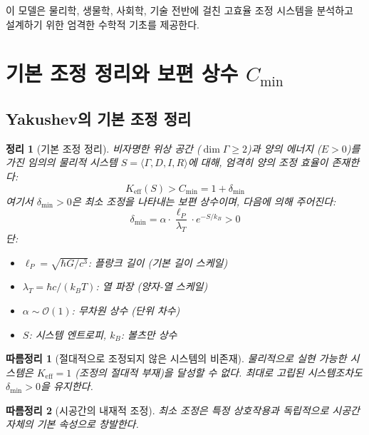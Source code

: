 \documentclass[11pt,a4paper]{article}
\newtheorem{theorem}{정리}
\newtheorem{corollary}{따름정리}
\begin{document}
이 모델은 물리학, 생물학, 사회학, 기술 전반에 걸친 고효율 조정 시스템을 분석하고 설계하기 위한 엄격한 수학적 기초를 제공한다.

\section{기본 조정 정리와 보편 상수 \texorpdfstring{$C_{\min}$}{C\_min}}
\label{sec:fundamental-theorem}

\subsection{Yakushev의 기본 조정 정리}

\begin{theorem}[기본 조정 정리]
	비자명한 위상 공간 ($\dim\Gamma \geq 2$)과 양의 에너지 ($E > 0$)를 가진 임의의 물리적 시스템 $S = \langle \Gamma, D, I, R \rangle$에 대해, 엄격히 양의 조정 효율이 존재한다:
	\begin{equation}
		\boxed{K_{\mathrm{eff}}(S) > C_{\min} = 1 + \delta_{\min}}
	\end{equation}
	여기서 $\delta_{\min} > 0$은 최소 조정을 나타내는 보편 상수이며, 다음에 의해 주어진다:
	\begin{equation}
		\delta_{\min} = \alpha \cdot \frac{\ell_P}{\lambda_T} \cdot e^{-S/k_B} > 0
	\end{equation}
	단:
	\begin{itemize}
		\item $\ell_P = \sqrt{\hbar G/c^3}$: 플랑크 길이 (기본 길이 스케일)
		\item $\lambda_T = \hbar c/(k_B T)$: 열 파장 (양자-열 스케일)
		\item $\alpha \sim \mathcal{O}(1)$: 무차원 상수 (단위 차수)
		\item $S$: 시스템 엔트로피, $k_B$: 볼츠만 상수
	\end{itemize}
\end{theorem}

\begin{corollary}[절대적으로 조정되지 않은 시스템의 비존재]
	물리적으로 실현 가능한 시스템은 $K_{\mathrm{eff}} = 1$ (조정의 절대적 부재)을 달성할 수 없다. 최대로 고립된 시스템조차도 $\delta_{\min} > 0$을 유지한다.
\end{corollary}

\begin{corollary}[시공간의 내재적 조정]
	최소 조정은 특정 상호작용과 독립적으로 시공간 자체의 기본 속성으로 창발한다.
\end{corollary}
\end{document}
